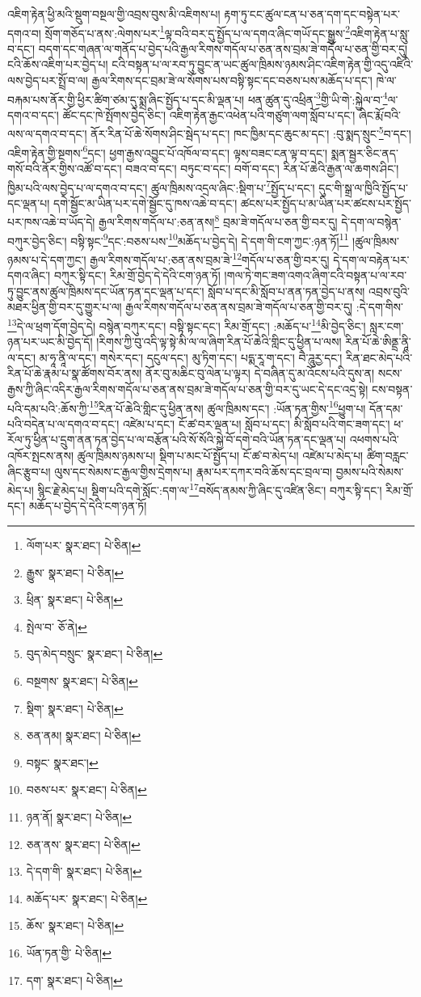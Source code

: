 འཇིག་རྟེན་ཕྱི་མའི་སྡུག་བསྔལ་གྱི་འབྲས་བུས་མི་འཇིགས་པ། རྟག་ཏུ་ངང་ཚུལ་ངན་པ་ཅན་དག་དང་བསྟེན་པར་དགའ་བ། སྲོག་གཅོད་པ་ནས་:ལེགས་པར་\footnote{ལོག་པར་  སྣར་ཐང་།  པེ་ཅིན། }ལྟ་བའི་བར་དུ་སྤྱོད་པ་ལ་དགའ་ཞིང་གཡོ་དང་སྒྱུས་\footnote{རྒྱུས་  སྣར་ཐང་།  པེ་ཅིན། }འཇིག་རྟེན་པ་སླུ་བ་དང་། བདག་དང་གཞན་ལ་གནོད་པ་བྱེད་པའི་རྒྱལ་རིགས་གདོལ་པ་ཅན་ནས་བྲམ་ཟེ་གདོལ་པ་ཅན་གྱི་བར་དུ། ངའི་ཆོས་འཇིག་པར་བྱེད་པ། ངའི་བསྟན་པ་ལ་རབ་ཏུ་བྱུང་ན་ཡང་ཚུལ་ཁྲིམས་ཉམས་ཤིང་འཇིག་རྟེན་གྱི་འདུ་འཛིའི་ལས་བྱེད་པར་སྤྲོ་བ་ལ། རྒྱལ་རིགས་དང་བྲམ་ཟེ་ལ་སོགས་པས་བསྟི་སྟང་དང་བཅས་པས་མཆོད་པ་དང་། ཁེ་ལ་བརྐམ་པས་ནོར་གྱི་ཕྱིར་ཚིག་ཙམ་དུ་སྨྲ་ཞིང་སྤྱོད་པ་དང་མི་ལྡན་པ། ཕན་ཚུན་དུ་འཕྲིན་\footnote{ཕྲིན་  སྣར་ཐང་།  པེ་ཅིན། }གྱི་ཡི་གེ་:སྐྱེལ་བ་\footnote{སྤེལ་བ་  ཅོ་ནེ། }ལ་དགའ་བ་དང་། ཚོང་དང་ཁེ་སྤོགས་བྱེད་ཅིང་། འཇིག་རྟེན་རྒྱང་འཕེན་པའི་གཙུག་ལག་སློབ་པ་དང་། ཞིང་རྨོ་བའི་ལས་ལ་དགའ་བ་དང་། ནོར་རིན་པོ་ཆེ་སོགས་ཤིང་སྦེད་པ་དང་། ཁང་ཁྱིམ་དང་ཆུང་མ་དང་། :བུ་སྨད་སྲུང་\footnote{བུད་མེད་བསྲུང་  སྣར་ཐང་།  པེ་ཅིན། }བ་དང་། འཇིག་རྟེན་གྱི་སྔགས་\footnote{བསྔགས་  སྣར་ཐང་།  པེ་ཅིན། }དང་། ཕྱག་རྒྱས་འབྱུང་པོ་འཁོལ་བ་དང་། ལྟས་བཟང་ངན་ལྟ་བ་དང་། སྨན་སྦྱར་ཅིང་ནད་གསོ་བའི་ནོར་གྱིས་འཚོ་བ་དང་། བཟའ་བ་དང་། བཏུང་བ་དང་། བགོ་བ་དང་། རིན་པོ་ཆེའི་རྒྱན་ལ་ཆགས་ཤིང་། ཁྱིམ་པའི་ལས་བྱེད་པ་ལ་དགའ་བ་དང་། ཚུལ་ཁྲིམས་འདྲལ་ཞིང་:སྡིག་པ་\footnote{སྡིག་  སྣར་ཐང་།  པེ་ཅིན། }སྤྱོད་པ་དང་། དུང་གི་སྒྲ་ལ་ཁྱིའི་སྤྱོད་པ་དང་ལྡན་པ། དགེ་སྦྱོང་མ་ཡིན་པར་དགེ་སྦྱོང་དུ་ཁས་འཆེ་བ་དང་། ཚངས་པར་སྤྱོད་པ་མ་ཡིན་པར་ཚངས་པར་སྤྱོད་པར་ཁས་འཆེ་བ་ཡོད་དེ། རྒྱལ་རིགས་གདོལ་པ་:ཅན་ནས།\footnote{ཅན་ནམ།  སྣར་ཐང་།  པེ་ཅིན། } བྲམ་ཟེ་གདོལ་པ་ཅན་གྱི་བར་དུ། དེ་དག་ལ་བསྙེན་བཀུར་བྱེད་ཅིང་། བསྟི་སྟང་\footnote{བསྟང་  སྣར་ཐང་། }དང་:བཅས་པས་\footnote{བཅས་པར་  སྣར་ཐང་།  པེ་ཅིན། }མཆོད་པ་བྱེད་དེ། དེ་དག་གི་ངག་ཀྱང་:ཉན་ཏོ།\footnote{ཉན་ནོ།  སྣར་ཐང་།  པེ་ཅིན། } །ཚུལ་ཁྲིམས་ཉམས་པ་དེ་དག་ཀྱང་། རྒྱལ་རིགས་གདོལ་པ་:ཅན་ནས་བྲམ་ཟེ་\footnote{ཅན་ནས་  སྣར་ཐང་།  པེ་ཅིན། }གདོལ་པ་ཅན་གྱི་བར་དུ། དེ་དག་ལ་བརྟེན་པར་དགའ་ཞིང་། བཀུར་སྟི་དང་། རིམ་གྲོ་བྱེད་དེ་དེའི་ངག་ཉན་ཏོ། །གལ་ཏེ་གང་ཟག་འགའ་ཞིག་ངའི་བསྟན་པ་ལ་རབ་ཏུ་བྱུང་ནས་ཚུལ་ཁྲིམས་དང་ཡོན་ཏན་དང་ལྡན་པ་དང་། སློབ་པ་དང་མི་སློབ་པ་ནན་ཏན་བྱེད་པ་ནས། འབྲས་བུའི་མཐར་ཕྱིན་གྱི་བར་དུ་གྱུར་པ་ལ། རྒྱལ་རིགས་གདོལ་པ་ཅན་ནས་བྲམ་ཟེ་གདོལ་པ་ཅན་གྱི་བར་དུ། :དེ་དག་གིས་\footnote{དེ་དག་གི་  སྣར་ཐང་།  པེ་ཅིན། }དེ་ལ་ཕྲག་དོག་བྱེད་དེ། བསྙེན་བཀུར་དང་། བསྟི་སྟང་དང་། རིམ་གྲོ་དང་། :མཆོད་པ་\footnote{མཆོད་པར་  སྣར་ཐང་།  པེ་ཅིན། }མི་བྱེད་ཅིང་། སླར་ངག་ཉན་པར་ཡང་མི་བྱེད་དོ། །རིགས་ཀྱི་བུ་འདི་ལྟ་སྟེ་མི་ལ་ལ་ཞིག་རིན་པོ་ཆེའི་གླིང་དུ་ཕྱིན་པ་ལས། རིན་པོ་ཆེ་ཨིནྡྲ་ནཱི་ལ་དང་། མ་ཧཱ་ནཱི་ལ་དང་། གསེར་དང་། དངུལ་དང་། མུ་ཏིག་དང་། པདྨ་རཱ་ག་དང་། བཻ་ཌཱུརྱ་དང་། རིན་ཐང་མེད་པའི་རིན་པོ་ཆེ་རྣམ་པ་སྣ་ཚོགས་བོར་ནས། ནོར་བུ་མཆིང་བུ་ལེན་པ་ལྟར། དེ་བཞིན་དུ་མ་འོངས་པའི་དུས་ན། སངས་རྒྱས་ཀྱི་ཞིང་འདིར་རྒྱལ་རིགས་གདོལ་པ་ཅན་ནས་བྲམ་ཟེ་གདོལ་པ་ཅན་གྱི་བར་དུ་ཡང་དེ་དང་འདྲ་སྟེ། ངས་བསྟན་པའི་དམ་པའི་:ཆོས་ཀྱི་\footnote{ཆོས་  སྣར་ཐང་།  པེ་ཅིན། }རིན་པོ་ཆེའི་གླིང་དུ་ཕྱིན་ནས། ཚུལ་ཁྲིམས་དང་། :ཡོན་ཏན་གྱིས་\footnote{ཡོན་ཏན་གྱི་  པེ་ཅིན། }ཕྱུག་པ། དོན་དམ་པའི་བདེན་པ་ལ་དགའ་བ་དང་། འཛེམ་པ་དང་། ངོ་ཚ་བར་ལྡན་པ། སློབ་པ་དང་། མི་སློབ་པའི་གང་ཟག་དང་། ཕ་རོལ་ཏུ་ཕྱིན་པ་དྲུག་ནན་ཏན་བྱེད་པ་ལ་བརྩོན་པའི་སོ་སོའི་སྐྱེ་བོ་དགེ་བའི་ཡོན་ཏན་དང་ལྡན་པ། འཕགས་པའི་འཁོར་སྤངས་ནས། ཚུལ་ཁྲིམས་ཉམས་པ། སྡིག་པ་མང་པོ་སྤྱོད་པ། ངོ་ཚ་བ་མེད་པ། འཛེམ་པ་མེད་པ། ཚིག་བརླང་ཞིང་རྩུབ་པ། ལུས་དང་སེམས་ང་རྒྱལ་གྱིས་དྲེགས་པ། རྣམ་པར་དཀར་བའི་ཆོས་དང་བྲལ་བ། བྱམས་པའི་སེམས་མེད་པ། སྙིང་རྗེ་མེད་པ། སྡིག་པའི་དགེ་སློང་:དག་ལ་\footnote{དག་  སྣར་ཐང་།  པེ་ཅིན། }བསོད་ནམས་ཀྱི་ཞིང་དུ་འཛིན་ཅིང་། བཀུར་སྟི་དང་། རིམ་གྲོ་དང་། མཆོད་པ་བྱེད་དེ་དེའི་ངག་ཉན་ཏོ། 